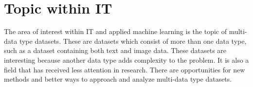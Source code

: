 \chapter{Topic within IT}

The area of interest within IT and applied machine learning is the topic of multi-data type datasets.  These are datasets which consist of more than one data type, such as a dataset containing both text and image data.  These datasets are interesting because another data type adds complexity to the problem.  It is also a field that has received less attention in research.  There are opportunities for new methods and better ways to approach and analyze multi-data type datasets.








